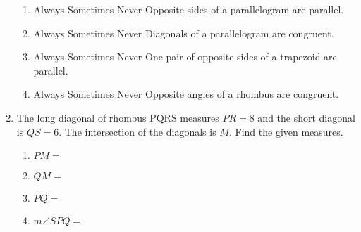 \documentclass[12pt, twoside]{article}
\begin{document}
\begin{enumerate}
\begin{center}
  \end{center}
    \begin{enumerate}
      \item Always \quad Sometimes \quad  Never \quad Opposite sides of a parallelogram are parallel. \vspace{0.25cm}
      \item Always \quad Sometimes \quad  Never \quad Diagonals of a parallelogram are congruent. \vspace{0.25cm}
      \item Always \quad Sometimes \quad  Never \quad One pair of opposite sides of a trapezoid are parallel. \vspace{0.25cm}
      \item Always \quad Sometimes \quad  Never \quad Opposite angles of a rhombus are congruent.
    \end{enumerate}

  \item The long diagonal of rhombus PQRS measures $PR=8$ and the short diagonal is $QS=6$. The intersection of the diagonals is $M$. Find the given measures.\vspace{0.25cm}
    \begin{multicols}{2}
      \begin{enumerate}
        \item $PM=$ \vspace{0.5cm}
        \item $QM=$ \vspace{0.5cm}
        \item $PQ=$ \vspace{0.5cm}
        \item $m\angle SPQ=$\vspace{1.5cm}
      \end{enumerate}
    \end{multicols}

\end{enumerate}
\end{document}
